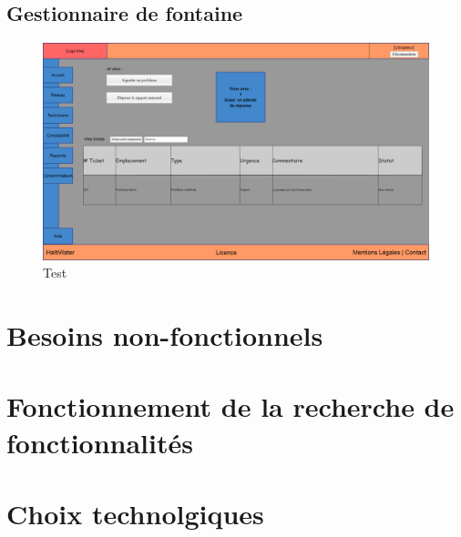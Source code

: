 \documentclass[a4paper, 11pt]{article}
\begin{document}
  \subsection{Gestionnaire de fontaine}
  \begin{figure}[H]
      \includegraphics[width=\textwidth]{Cahier_des_Charges/rapports}
      \caption{Test}
      \label{fig:reports}
  \end{figure}

\section{Besoins non-fonctionnels}
\section{Fonctionnement de la recherche de fonctionnalités}
\section{Choix technolgiques}
\end{document}

